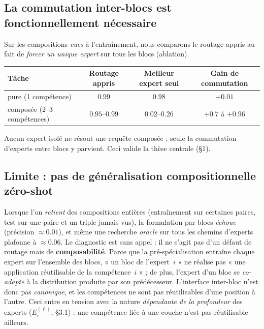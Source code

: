 \documentclass[10pt,a4paper]{article}
\begin{document}
\subsection{La commutation inter-blocs est fonctionnellement nécessaire}
Sur les compositions \emph{vues} à l'entraînement, nous comparons le routage appris au fait de \emph{forcer un unique expert} sur tous les blocs (ablation).

\begin{center}
\begin{tabular}{lccc}
\toprule
Tâche & Routage appris & Meilleur expert seul & Gain de commutation \\
\midrule
pure (1 compétence) & $0.99$ & $0.98$ & $+0.01$ \\
composée (2--3 compétences) & $0.95$--$0.99$ & $0.02$--$0.26$ & $+0.7$ à $+0.96$ \\
\bottomrule
\end{tabular}
\end{center}

Aucun expert isolé ne résout une requête composée ; seule la commutation d'experts entre blocs y parvient. Ceci valide la thèse centrale (§1).

\subsection{Limite : pas de généralisation compositionnelle zéro-shot}
Lorsque l'on \emph{retient} des compositions entières (entraînement sur certaines paires, test sur une paire et un triple jamais vus), la formulation par blocs \emph{échoue} (précision $\approx 0.01$), et même une recherche \emph{oracle} sur tous les chemins d'experts plafonne à $\approx 0.06$. Le diagnostic est sans appel : il ne s'agit pas d'un défaut de routage mais de \textbf{composabilité}. Parce que la pré-spécialisation entraîne chaque expert sur l'ensemble des blocs, « un bloc de l'expert~$i$ » ne réalise pas « une application réutilisable de la compétence~$i$ » ; de plus, l'expert d'un bloc se \emph{co-adapte} à la distribution produite par son prédécesseur. L'interface inter-bloc n'est donc pas \emph{canonique}, et les compétences ne sont pas réutilisables d'une position à l'autre. Ceci entre en tension avec la nature \emph{dépendante de la profondeur} des experts ($E_i^{(\ell)}$, §3.1) : une compétence liée à une couche n'est pas réutilisable ailleurs.
\end{document}
